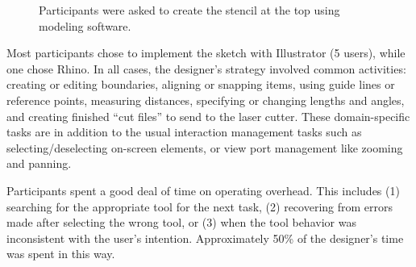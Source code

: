 \documentclass{article}
\begin{document}
\begin{figure}[h]
\centering 
{}

\caption{Participants were asked to create the stencil at the top
  using modeling software.}
\label{fig:interview-sketch}
\end{figure}

Most participants chose to implement the sketch with Illustrator (5
users), while one chose Rhino. In all cases, the designer's strategy
involved common activities: creating or editing boundaries, aligning
or snapping items, using guide lines or reference points, measuring
distances, specifying or changing lengths and angles, and creating
finished ``cut files'' to send to the laser cutter. These
domain-specific tasks are in addition to the usual interaction
management tasks such as selecting/deselecting on-screen elements, or
view port management like zooming and panning.

Participants spent a good deal of time on operating overhead. This
includes (1) searching for the appropriate tool for the next task, (2)
recovering from errors made after selecting the wrong tool, or (3)
when the tool behavior was inconsistent with the user's
intention. Approximately 50\% of the designer's time was spent in this
way.
\end{document}
